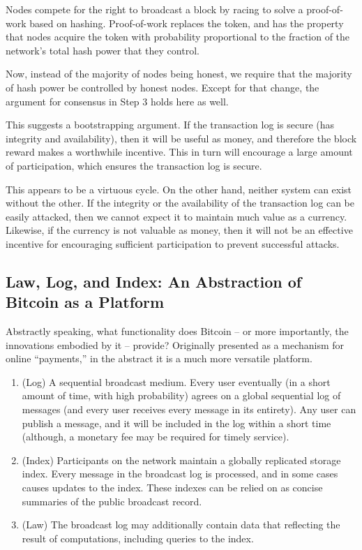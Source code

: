 Nodes  compete  for the right to broadcast a block by  racing  to  solve  a  proof-of-work  based  on  hashing.  Proof-of-work replaces the token, and has the property that nodes acquire the token with probability proportional to the fraction of the network's total hash power that they control.

Now, instead of the majority of nodes being honest, we require that the majority of hash power be controlled by honest nodes. Except for that change, the argument for consensus in Step 3 holds here as well.


This suggests a bootstrapping argument. If the transaction log is secure (has integrity and availability), then it will be useful as money, and therefore the block reward makes a worthwhile incentive. This in turn will encourage a large amount of participation, which ensures the transaction log is secure.

This appears to be a virtuous cycle. On the other hand, neither system can exist without the other. If the integrity or the availability of the transaction log can be easily attacked, then we cannot expect it to maintain much value as a currency. Likewise, if the currency is not valuable as money, then it will not be an effective incentive for encouraging sufficient participation to prevent successful attacks.


\subsection{Law, Log, and Index: An Abstraction of Bitcoin as a Platform}

Abstractly speaking, what functionality does Bitcoin -- or more importantly, the innovations embodied by it -- provide? Originally presented as a mechanism for online ``payments,'' in the abstract it is a much more versatile platform.

\begin{enumerate}
\item (Log) A sequential broadcast medium. Every user eventually (in a short amount of time, with high probability) agrees on a global sequential log of messages (and every user receives every message in its entirety). Any user can publish a message, and it will be included in the log within a short time (although, a monetary fee may be required for timely service).
\item (Index) Participants on the network maintain a globally replicated storage index. Every message in the broadcast log is processed, and in some cases causes updates to the index. These indexes can be relied on as concise summaries of the public broadcast record.
\item (Law) The broadcast log may additionally contain data that reflecting the result of computations, including queries to the index.
\end{enumerate}


